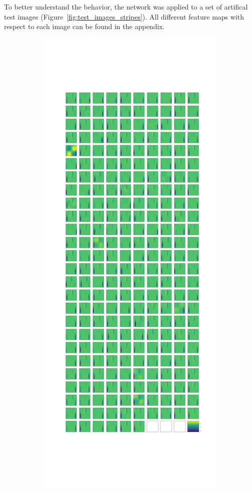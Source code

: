 To better understand the behavior, the network was applied to a set of artifical test images (Figure~\ref{fig:test_images_stripes}).
All different feature maps with respect to each image can be found in the appendix.

\begin{figure}
    \centering
    \begin{subfigure}{0.45\textwidth}
        \centering
        \includegraphics[width=\textwidth]{images/stripes/test_img_9/leaky_re_lu_5.png}

\end{subfigure}
\end{figure}

